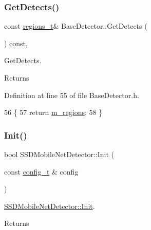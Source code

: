 \subsubsection{\texorpdfstring{Get\+Detects()}{GetDetects()}}
{\footnotesize\ttfamily const \mbox{\hyperlink{defines_8h_a01db0de56a20f4342820a093c5154536}{regions\+\_\+t}}\& Base\+Detector\+::\+Get\+Detects (\begin{DoxyParamCaption}{ }\end{DoxyParamCaption}) const\hspace{0.3cm}{\ttfamily [inline]}, {\ttfamily [inherited]}}



Get\+Detects. 

\begin{DoxyReturn}{Returns}

\end{DoxyReturn}


Definition at line 55 of file Base\+Detector.\+h.


\begin{DoxyCode}
56     \{
57         \textcolor{keywordflow}{return} \mbox{\hyperlink{class_base_detector_a409c20093acba261db8354ca72058fce}{m\_regions}};
58     \}
\end{DoxyCode}
\mbox{\label{class_s_s_d_mobile_net_detector_a2830cbf9b82b159c25fb2796b867eaef}} 
\subsubsection{\texorpdfstring{Init()}{Init()}}
{\footnotesize\ttfamily bool S\+S\+D\+Mobile\+Net\+Detector\+::\+Init (\begin{DoxyParamCaption}\item[{const \mbox{\hyperlink{defines_8h_a81d657237a541d02f8eeefdd40191920}{config\+\_\+t}} \&}]{config }\end{DoxyParamCaption})\hspace{0.3cm}{\ttfamily [virtual]}}



\mbox{\hyperlink{class_s_s_d_mobile_net_detector_a2830cbf9b82b159c25fb2796b867eaef}{S\+S\+D\+Mobile\+Net\+Detector\+::\+Init}}. 

\begin{DoxyReturn}{Returns}

\end{DoxyReturn}


